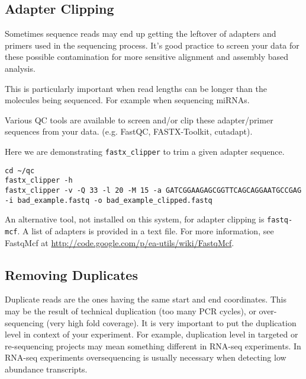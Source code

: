 \begin{advanced}
\subsection{Adapter Clipping}
Sometimes sequence reads may end up getting the leftover of adapters and primers
used in the sequencing process. It's good practice to screen your data for
these possible contamination for more sensitive alignment and assembly based
analysis.

\begin{note}
This is particularly important when read lengths can be longer than the
molecules being sequenced. For example when sequencing miRNAs.
\end{note}

Various QC tools are available to screen and/or clip these adapter/primer
sequences from your data. (e.g. FastQC, FASTX-Toolkit, cutadapt).

\begin{steps}
Here we are demonstrating \texttt{fastx\_clipper} to trim a given adapter
sequence.

\begin{lstlisting}
cd ~/qc
fastx_clipper -h
fastx_clipper -v -Q 33 -l 20 -M 15 -a GATCGGAAGAGCGGTTCAGCAGGAATGCCGAG -i bad_example.fastq -o bad_example_clipped.fastq
\end{lstlisting}
\end{steps}

\begin{note}
An alternative tool, not installed on this system, for adapter clipping is
\texttt{fastq-mcf}. A list of adapters is provided in a text file. For more
information, see FastqMcf at \url{http://code.google.com/p/ea-utils/wiki/FastqMcf}.
\end{note}

\subsection{Removing Duplicates}
Duplicate reads are the ones having the same start and end coordinates. This
may be the result of technical duplication (too many PCR cycles), or
over-sequencing (very high fold coverage). It is very important to put the
duplication level in context of your experiment. For example, duplication level
in targeted or re-sequencing projects may mean something different in RNA-seq
experiments. In RNA-seq experiments oversequencing is usually necessary when
detecting low abundance transcripts.


\end{advanced}
